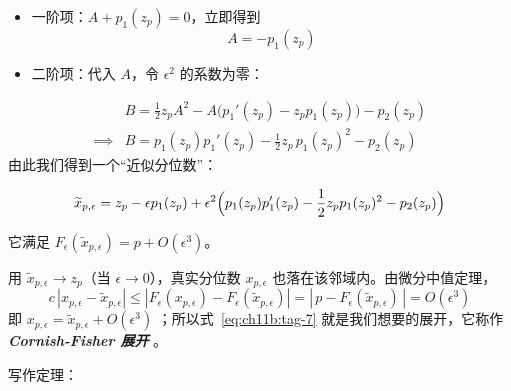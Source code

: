 \begin{itemize}
\tightlist
\item
  一阶项：$A + p_1(z_p) = 0$，立即得到 \[A = -p_1(z_p)\]\item
  二阶项：代入 $A$，令 $\epsilon^2$ 的系数为零：
\end{itemize}
\[\begin{aligned} & B = \frac12 z_p A^2 - A\bigl(p_1'(z_p)-z_p p_1(z_p)\bigr) - p_2(z_p)\\ \implies &B= p_1(z_p)p_1'(z_p) - \frac12 z_p\, p_1(z_p)^2 - p_2(z_p) \end{aligned}\]
由此我们得到一个``近似分位数''：

\begin{equation}
\label{eq:ch11b:tag-7}
\widetilde{x}_{p,\epsilon} = z_p - \epsilon p_1(z_p) + \epsilon^2\Bigl( p_1(z_p)p_1'(z_p) - \frac12 z_p p_1(z_p)^2 - p_2(z_p) \Bigr)
\end{equation}

它满足 $F_\epsilon(\widetilde{x}_{p,\epsilon}) = p + O(\epsilon^3)$。

用 $\widetilde{x}_{p,\epsilon} \to z_p$（当 $\epsilon\to0$），真实分位数 $x_{p,\epsilon}$ 也落在该邻域内。由微分中值定理，
\[c\,|x_{p,\epsilon} - \widetilde{x}_{p,\epsilon}|\le |F_\epsilon(x_{p,\epsilon}) - F_\epsilon(\widetilde{x}_{p,\epsilon})|=|\,p - F_\epsilon(\widetilde{x}_{p,\epsilon})\,|=O(\epsilon^3)\]
即 $x_{p,\epsilon} = \widetilde{x}_{p,\epsilon} + O(\epsilon^3)$ ；所以式~\eqref{eq:ch11b:tag-7} 就是我们想要的展开，它称作 \textbf{\emph{Cornish-Fisher 展开}} 。

写作定理：

